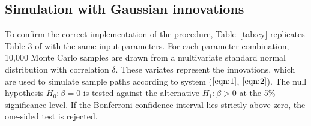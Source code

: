 \documentclass[11pt, a4paper]{article}
\begin{document}
\subsection{Simulation with Gaussian innovations}
\label{Simulation with Gaussian innovations}
To confirm the correct implementation of the procedure, Table~\vref{tab:cy} replicates Table 3 of \citet{campbell2006efficient} with the same input parameters. For each parameter combination, 10,000 Monte Carlo samples are drawn from a multivariate standard normal distribution with correlation $\delta$. These variates represent the innovations, which are used to simulate sample paths according to system ($\ref{eqn:1}$, $\ref{eqn:2}$). The null hypothesis $H_0: \beta = 0$ is tested against the alternative $H_1: \beta > 0$ at the 5\% significance level. If the Bonferroni confidence interval lies strictly above zero, the one-sided test is rejected. 
\end{document}
